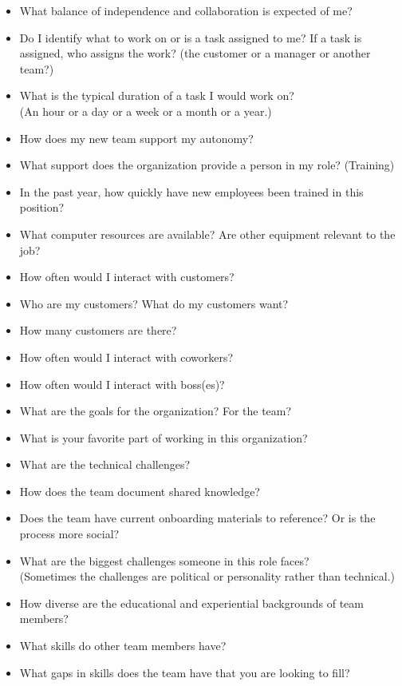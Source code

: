 \begin{itemize}
    \item What balance of independence and collaboration is expected of me?
    \item Do I identify what to work on or is a task assigned to me? If a task is assigned, who assigns the work? (the customer or a manager or another team?)
    \item What is the typical duration of a task I would work on? \\
    (An hour or a day or a week or a month or a year.)
    \item How does my new team support my autonomy?
    \item What support does the organization provide a person in my role? (Training)
    \item In the past year, how quickly have new employees been trained in this position?
    \item What computer resources are available? Are other equipment relevant to the job? 

    \item How often would I interact with customers? 
    \item Who are my customers? What do my customers want?
    \item How many customers are there?
    \item How often would I interact with coworkers? 
    \item How often would I interact with boss(es)? 
    \item What are the goals for the organization? For the team?

    \item What is your favorite part of working in this organization?

    \item What are the technical challenges?
    \item How does the team document shared knowledge?
    \item Does the team have current onboarding materials to reference? Or is the process more social?
    \item What are the biggest challenges someone in this role faces? \\
    (Sometimes the challenges are political or personality rather than technical.)
    \item How diverse are the educational and experiential backgrounds of team members?
    \item What skills do other team members have?
    \item What gaps in skills does the team have that you are looking to fill?
    

\end{itemize}
